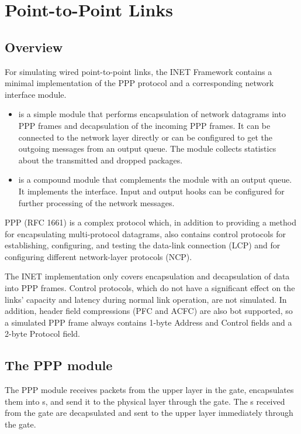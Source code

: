 \chapter{Point-to-Point Links}
\label{cha:ppp}


\section{Overview}

For simulating wired point-to-point links, the INET Framework contains
a minimal implementation of the PPP protocol and a corresponding network
interface module. 

\begin{itemize}
  \item {} is a simple module that performs encapsulation
    of network datagrams into PPP frames and decapsulation of
    the incoming PPP frames. It can be connected to the network
    layer directly or can be configured to get the outgoing messages
    from an output queue. The module collects statistics about
    the transmitted and dropped packages.
  \item {} is a compound module that complements
    the  module with an output queue. It implements
    the  interface. Input and output hooks 
    can be configured for further processing of the network messages.
\end{itemize}

PPP (RFC 1661) is a complex protocol which, in addition to providing 
a method for encapsulating multi-protocol datagrams, also contains 
control protocols for establishing, configuring, and testing the data-link 
connection (LCP) and for configuring different network-layer protocols (NCP). 

The INET implementation only covers encapsulation and decapsulation of 
data into PPP frames. Control protocols, which do not have a significant
effect on the links' capacity and latency during normal link operation,
are not simulated. In addition, header field compressions (PFC and ACFC)
are also bot supported, so a simulated PPP frame always contains 1-byte
Address and Control fields and a 2-byte Protocol field. 


\section{The PPP module}

The PPP module receives packets from the upper layer in the 
gate, encapsulates them into s, and send it to the
physical layer through the  gate. The s
received from the  gate are decapsulated and sent to the upper
layer immediately through the  gate.

